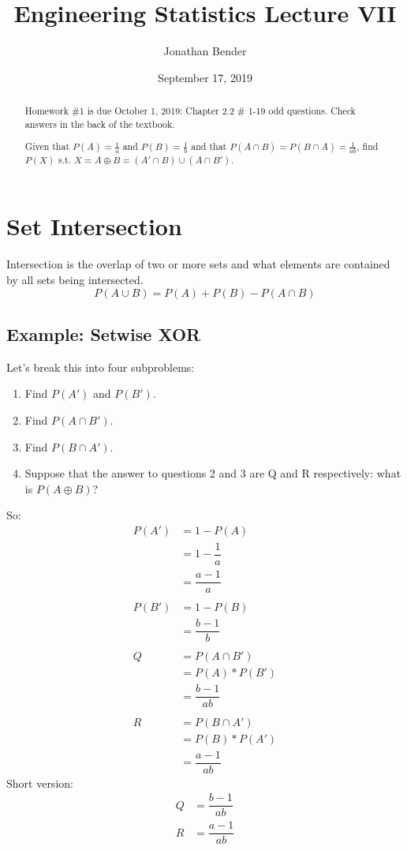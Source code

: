 \documentclass[]{article}
\title{Engineering Statistics Lecture VII}
\author{Jonathan Bender}
\date{September 17, 2019}
\begin{document}
	\maketitle

	\begin{abstract}
	Homework \#1 is due October 1, 2019:
	Chapter 2.2 \# 1-19 odd questions.
	Check answers in the back of the textbook.
	\end{abstract}

	\section{Set Intersection}
		Intersection is the overlap of two or more sets and what elements are contained by all sets being intersected.
		\begin{equation}
			P(A \cup B) = P(A) + P(B) - P(A\cap B)
			\label{Probability of union}
		\end{equation}
	
		\subsection{Example: Setwise XOR}
			\begin{abstract}
				Given that $P(A) = \frac{1}{a}$ and $P(B) = \frac{1}{b}$ and that $P(A\cap B) = P(B\cap A) = \frac{1}{ab}$, find $P(X)$ s.t. $X = A \oplus B = (A' \cap B) \cup (A \cap B')$.
			\end{abstract}
			Let's break this into four subproblems:
			\begin{enumerate}
				\item Find $P(A')$ and $P(B')$.
				\item Find $P(A \cap B').$
				\item Find $P(B \cap A').$
				\item Suppose that the answer to questions 2 and 3 are Q and R respectively: what is $P(A \oplus B)$?
			\end{enumerate}
			\pagebreak
			
			So:
			\begin{align*}
			P(A') &= 1 - P(A) \\
			      &= 1 - \dfrac{1}{a} \\
			      &= \dfrac{a - 1}{a} \\\\
			P(B') &= 1 - P(B) \\
			      &= \dfrac{b - 1}{b} \\\\
			Q     &= P(A\cap B')  \\
			      &= P(A) * P(B') \\
			      &= \dfrac{b - 1}{ab} \\\\
			R     &= P(B\cap A') \\
			      &= P(B) * P(A') \\
			      &= \dfrac{a - 1}{ab}
			\end{align*}
			Short version:
			\begin{align*}
			Q &= \dfrac{b-1}{ab} \\
			R &= \dfrac{a-1}{ab}
			\end{align*}
			
\end{document}
